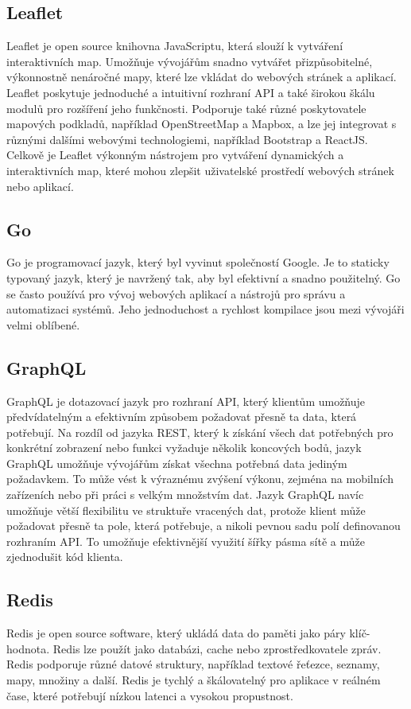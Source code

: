 \subsection{Leaflet}
Leaflet je open source knihovna JavaScriptu, která slouží k vytváření interaktivních map. Umožňuje vývojářům snadno vytvářet přizpůsobitelné, výkonnostně nenáročné mapy, které lze vkládat do webových stránek a aplikací. Leaflet poskytuje jednoduché a intuitivní rozhraní API a také širokou škálu modulů pro rozšíření jeho funkčnosti. Podporuje také různé poskytovatele mapových podkladů, například OpenStreetMap a Mapbox, a lze jej integrovat s různými dalšími webovými technologiemi, například Bootstrap a ReactJS. Celkově je Leaflet výkonným nástrojem pro vytváření dynamických a interaktivních map, které mohou zlepšit uživatelské prostředí webových stránek nebo aplikací.
\subsection{Go}
Go je programovací jazyk, který byl vyvinut společností Google. Je to staticky typovaný jazyk, který je navržený tak, aby byl efektivní a snadno použitelný. Go se často používá pro vývoj webových aplikací a nástrojů pro správu a automatizaci systémů. Jeho jednoduchost a rychlost kompilace jsou mezi vývojáři velmi oblíbené.

\subsection{GraphQL}\label{graphql}
GraphQL je dotazovací jazyk pro rozhraní API, který klientům umožňuje předvídatelným a efektivním způsobem požadovat přesně ta data, která potřebují. Na rozdíl od jazyka REST, který k získání všech dat potřebných pro konkrétní zobrazení nebo funkci vyžaduje několik koncových bodů, jazyk GraphQL umožňuje vývojářům získat všechna potřebná data jediným požadavkem. To může vést k výraznému zvýšení výkonu, zejména na mobilních zařízeních nebo při práci s velkým množstvím dat. Jazyk GraphQL navíc umožňuje větší flexibilitu ve struktuře vracených dat, protože klient může požadovat přesně ta pole, která potřebuje, a nikoli pevnou sadu polí definovanou rozhraním API. To umožňuje efektivnější využití šířky pásma sítě a může zjednodušit kód klienta.
\subsection{Redis}\label{redis}
Redis je open source software, který ukládá data do paměti jako páry klíč-hodnota. Redis lze použít jako databázi, cache nebo zprostředkovatele zpráv. Redis podporuje různé datové struktury, například textové řeťezce, seznamy, mapy, množiny a další. Redis je tychlý a škálovatelný pro aplikace v reálném čase, které potřebují nízkou latenci a vysokou propustnost.

